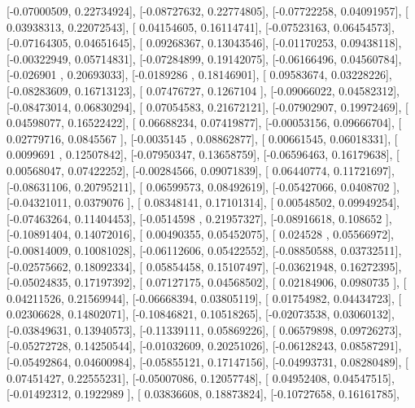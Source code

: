 \documentclass{article}
\begin{document}
       [-0.07000509,  0.22734924],
       [-0.08727632,  0.22774805],
       [-0.07722258,  0.04091957],
       [ 0.03938313,  0.22072543],
       [ 0.04154605,  0.16114741],
       [-0.07523163,  0.06454573],
       [-0.07164305,  0.04651645],
       [ 0.09268367,  0.13043546],
       [-0.01170253,  0.09438118],
       [-0.00322949,  0.05714831],
       [-0.07284899,  0.19142075],
       [-0.06166496,  0.04560784],
       [-0.026901  ,  0.20693033],
       [-0.0189286 ,  0.18146901],
       [ 0.09583674,  0.03228226],
       [-0.08283609,  0.16713123],
       [ 0.07476727,  0.1267104 ],
       [-0.09066022,  0.04582312],
       [-0.08473014,  0.06830294],
       [ 0.07054583,  0.21672121],
       [-0.07902907,  0.19972469],
       [ 0.04598077,  0.16522422],
       [ 0.06688234,  0.07419877],
       [-0.00053156,  0.09666704],
       [ 0.02779716,  0.0845567 ],
       [-0.0035145 ,  0.08862877],
       [ 0.00661545,  0.06018331],
       [ 0.0099691 ,  0.12507842],
       [-0.07950347,  0.13658759],
       [-0.06596463,  0.16179638],
       [ 0.00568047,  0.07422252],
       [-0.00284566,  0.09071839],
       [ 0.06440774,  0.11721697],
       [-0.08631106,  0.20795211],
       [ 0.06599573,  0.08492619],
       [-0.05427066,  0.0408702 ],
       [-0.04321011,  0.0379076 ],
       [ 0.08348141,  0.17101314],
       [ 0.00548502,  0.09949254],
       [-0.07463264,  0.11404453],
       [-0.0514598 ,  0.21957327],
       [-0.08916618,  0.108652  ],
       [-0.10891404,  0.14072016],
       [ 0.00490355,  0.05452075],
       [ 0.024528  ,  0.05566972],
       [-0.00814009,  0.10081028],
       [-0.06112606,  0.05422552],
       [-0.08850588,  0.03732511],
       [-0.02575662,  0.18092334],
       [ 0.05854458,  0.15107497],
       [-0.03621948,  0.16272395],
       [-0.05024835,  0.17197392],
       [ 0.07127175,  0.04568502],
       [ 0.02184906,  0.0980735 ],
       [ 0.04211526,  0.21569944],
       [-0.06668394,  0.03805119],
       [ 0.01754982,  0.04434723],
       [ 0.02306628,  0.14802071],
       [-0.10846821,  0.10518265],
       [-0.02073538,  0.03060132],
       [-0.03849631,  0.13940573],
       [-0.11339111,  0.05869226],
       [ 0.06579898,  0.09726273],
       [-0.05272728,  0.14250544],
       [-0.01032609,  0.20251026],
       [-0.06128243,  0.08587291],
       [-0.05492864,  0.04600984],
       [-0.05855121,  0.17147156],
       [-0.04993731,  0.08280489],
       [ 0.07451427,  0.22555231],
       [-0.05007086,  0.12057748],
       [ 0.04952408,  0.04547515],
       [-0.01492312,  0.1922989 ],
       [ 0.03836608,  0.18873824],
       [-0.10727658,  0.16161785],
\end{document}

